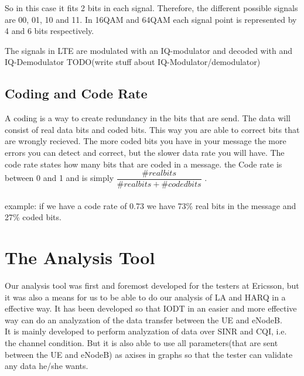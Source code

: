 \documentclass[cropmarks, frame, english]{idamasterthesis}
\begin{document}
 So in this case it fits 2 bits in each signal. Therefore, the different possible signals are 00, 01, 10 and 11. In 16QAM and 64QAM each signal point is represented by 4 and 6 bits respectively.

The signals in LTE are modulated with an IQ-modulator and decoded with and IQ-Demodulator 
TODO(write stuff about IQ-Modulator/demodulator)

\section{Coding and Code Rate}
A coding is a way to create redundancy in the bits that are send. The data will consist of real data bits and coded bits. This way you are able to correct bits that are wrongly recieved. The more coded bits you have in your message the more errors you can detect and correct, but the slower data rate you will have. The code rate states how many bits that are coded in a message. the Code rate is between 0 and 1 and is simply $\dfrac{\# real bits}{ \# real bits + \# coded bits}$ . 
\\ \\
example: if we have a code rate of 0.73 we have 73\% real bits in the message and 27\% coded bits. 



\chapter{The Analysis Tool}
Our analysis tool was first and foremost developed for the testers at Ericsson, but it was also a means for us to be able to do our analysis of LA and HARQ in a effective way. It has been developed so that IODT in an easier and more effective way can do an analyzation of the data transfer between the UE and eNodeB. \\
It is mainly developed to perform analyzation of data over SINR and CQI, i.e. the channel condition. But it is also able to use all parameters(that are sent between the UE and eNodeB) as axises in graphs so that the tester can validate any data he/she wants.
\end{document}
